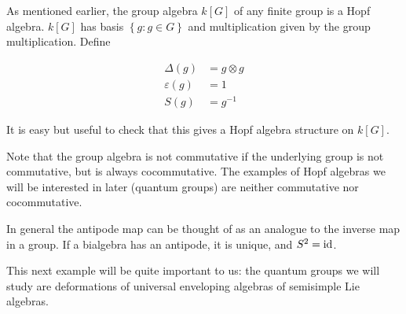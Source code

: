\begin{example}
    \label{example:groupalgebra}
    As mentioned earlier, the group algebra $k[G]$ of any finite group is a
    Hopf algebra. $k[G]$ has basis $\left\{ g: g \in G \right\}$ and
    multiplication given by the group multiplication. Define

\begin{align}
\Delta(g) &= g \otimes g \\
\varepsilon(g) &= 1 \\
S(g) &= g^{-1}
\end{align}

    It is easy but useful to check that this gives a Hopf algebra structure on $k[G]$.

    Note that the group algebra is not commutative if the underlying group is
    not commutative, but is always cocommutative. The examples of Hopf algebras
    we will be interested in later (quantum groups) are neither commutative nor
    cocommutative. 
\end{example}

In general the antipode map can be thought of as an analogue to the inverse map
in a group. If a bialgebra has an antipode, it is unique, and $S^2 = \operatorname{id}$.

This next example will be quite important to us: the quantum groups we will
study are deformations of universal enveloping algebras of semisimple Lie
algebras.


